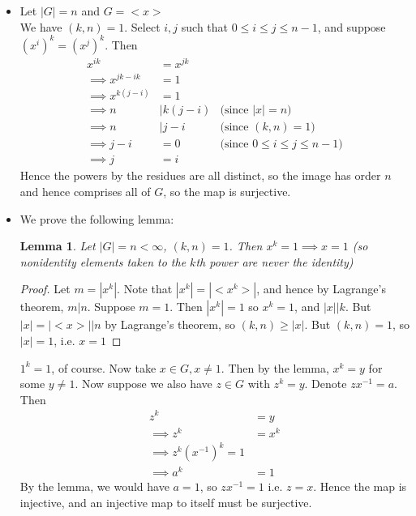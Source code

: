 \documentclass{article}
\newcommand{\inv}[1]{ {#1}^{-1} }
\newcommand{\norm}[1]{|#1|}
\newcommand{\divides}{\big\vert}
\newcommand{\cyclic}[1]{<#1>}
\newtheorem{lemma}[theorem]{Lemma}
\begin{document}
\subsubsection{}\label{ex3p25}
\begin{itemize} \label{ex3p25a}
\item Let $|G| = n$ and $G=\cyclic{x}$\\
We have $(k,n)=1$. Select $i,j$ such that $0\leq i \leq j \leq n-1$, and suppose $(x^i)^k = (x^j)^k$. Then
\begin{align*}
x^{ik} &= x^{jk}\\
\implies x^{jk - ik} &= 1\\
\implies x^{k(j - i)} &= 1\\
\implies n &\divides k(j-i) & \mbox{(since $\norm{x}=n$)}\\
\implies n &\divides j-i & \mbox{(since $(k,n)=1$)}\\
\implies j-i &= 0 & \mbox{(since $0\leq i \leq j \leq n-1$)}\\
\implies j &= i
\end{align*}
Hence the powers by the residues are all distinct, so the image has order $n$ and hence comprises all of $G$, so the map is surjective.
\item We prove the following lemma:
\begin{lemma} \label{lemma1}
Let $\norm{G} = n < \infty$, $(k,n)=1$. Then $x^k = 1 \implies x = 1$ (so nonidentity elements taken to the $k$th power are never the identity) 
\end{lemma}
\begin{proof}
Let $m = \norm{x^k}$. Note that $\norm{x^k}=\norm{\cyclic{x^k}}$, and hence by Lagrange's theorem, $m \divides n$. Suppose $m=1$. Then $\norm{x^k}=1$ so $x^k=1$, and $\norm{x} \divides k$. But $\norm{x} = \norm{\cyclic{x}} \divides n$ by Lagrange's theorem, so $(k,n) \geq \norm{x}$. But $(k,n)=1$, so $\norm{x} =1$, i.e. $x=1$
\end{proof}
$1^k =1$, of course. Now take $x \in G, x\neq 1$. Then by the lemma, $x^k = y$ for some $y \neq 1$. Now suppose we also have $z \in G$ with $z^k = y$. Denote $z\inv{x} = a$. Then
\begin{align*}
z^k &= y\\
\implies z^k &= x^k\\
\implies z^k(\inv{x})^k = 1\\
\implies a^k &= 1
\end{align*}
By the lemma, we would have $a=1$, so $z\inv{x}=1$ i.e. $z=x$. Hence the map is injective, and an injective map to itself must be surjective.
\end{itemize}
\end{document}
